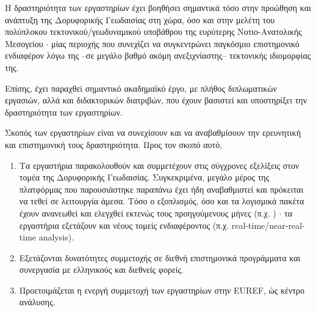 \documentclass[11pt]{article}
\begin{document}
\vspace{0.5cm}
Η δραστηριότητα των εργαστηρίων έχει βοηθήσει σημαντικά τόσο στην προώθηση και ανάπτυξη της Δορυφορικής Γεωδαισίας στη χώρα, όσο και στην μελέτη του πολύπλοκου τεκτονικού/γεωδυναμικού υποβάθρου της ευρύτερης Νοτιο-Ανατολικής Μεσογείου $\cdot$ μίας περιοχής που συνεχίζει να συγκεντρώνει παγκόσμιο επιστημονικό ενδιαφέρον λόγω της --σε μεγάλο βαθμό ακόμη ανεξιχνίαστης-- τεκτονικής ιδιομορφίας της.

Επίσης, έχει παραχθεί σημαντικό ακαδημαϊκό έργο, με πλήθος διπλωματικών εργασιών, αλλά και διδακτορικών διατριβών, που έχουν βασιστεί και υποστηρίξει την δραστηριότητα των εργαστηρίων.

\vspace{0.5cm}
Σκοπός των εργαστηρίων είναι να συνεχίσουν και να αναβαθμίσουν την ερευνητική και επιστημονική τους δραστηριότητα. Προς τον σκοπό αυτό,
\begin{enumerate}
\item Τα εργαστήρια παρακολουθούν και συμμετέχουν στις σύγχρονες εξελίξεις στον τομέα της Δορυφορικής Γεωδαισίας. Συγκεκριμένα, μεγάλο μέρος της πλατφόρμας που παρουσιάστηκε παραπάνω έχει ήδη αναβαθμιστεί και πρόκειται να τεθεί σε λειτουργία άμεσα. Τόσο ο εξοπλισμός, όσο και τα λογισμικά πακέτα έχουν ανανεωθεί και ελεγχθεί εκτενώς τους προηγούμενους μήνες (π.χ. \cite{mitseuref}) $\cdot$ τα εργαστήρια εξετάζουν και νέους τομείς ενδιαφέροντος (π.χ. real-time/near-real-time analysis).
\item Εξετάζονται δυνατότητες συμμετοχής σε διεθνή επιστημονικά προγράμματα και συνεργασία με ελληνικούς και διεθνείς φορείς.
\item Προετοιμάζεται η ενεργή συμμετοχή των εργαστηρίων στην EUREF, ώς κέντρο ανάλυσης.
\end{enumerate}
\end{document}
